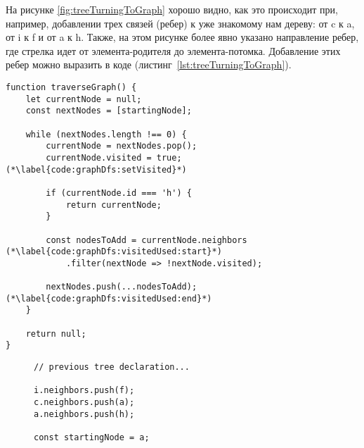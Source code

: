 \documentclass[../../article.tex]{subfiles}
\begin{document}
На рисунке \ref{fig:treeTurningToGraph} хорошо видно, как это происходит при, например, добавлении трех связей (ребер) к уже знакомому нам дереву: от {\firacodebold c} к {\firacodebold a}, от {\firacodebold i} к {\firacodebold f} и от {\firacodebold a} к {\firacodebold h}. Также, на этом рисунке более явно указано направление ребер, где стрелка идет от элемента-родителя до элемента-потомка. Добавление этих ребер можно выразить в коде (листинг~\ref{lst:treeTurningToGraph}).

\begin{figure*}
    \begin{ruledelement}
        \begin{lstlisting}[caption={Обход графа в глубину}, label={lst:graphDfs}]
function traverseGraph() {
    let currentNode = null;
    const nextNodes = [startingNode];

    while (nextNodes.length !== 0) {
        currentNode = nextNodes.pop();
        currentNode.visited = true; (*\label{code:graphDfs:setVisited}*)

        if (currentNode.id === 'h') {
            return currentNode;
        }

        const nodesToAdd = currentNode.neighbors (*\label{code:graphDfs:visitedUsed:start}*)
            .filter(nextNode => !nextNode.visited);

        nextNodes.push(...nodesToAdd); (*\label{code:graphDfs:visitedUsed:end}*)
    }

    return null;
}
        \end{lstlisting}
    \end{ruledelement}

\end{figure*}

\begin{figure}
    \begin{ruledelement}
        \begin{lstlisting}[caption={Добавление связей превращающих дерево в граф}, label={lst:treeTurningToGraph}]
// previous tree declaration...

i.neighbors.push(f);
c.neighbors.push(a);
a.neighbors.push(h);

const startingNode = a;
        \end{lstlisting}
    \end{ruledelement}
\end{figure}
\end{document}
